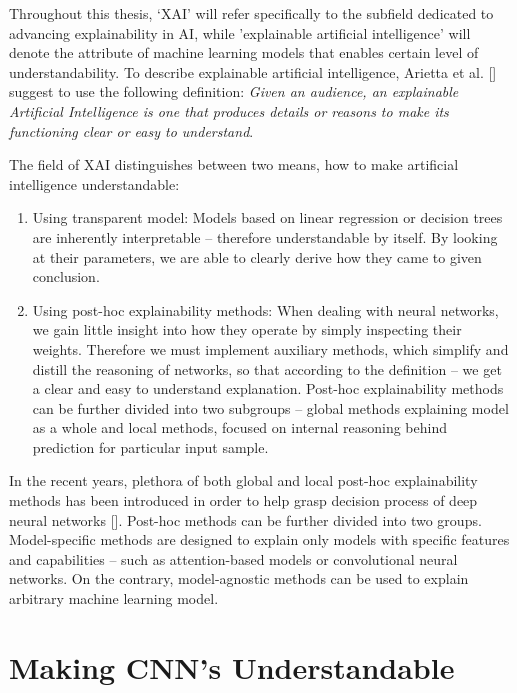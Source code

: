 
Throughout this thesis, `XAI' will refer specifically to the subfield dedicated to advancing explainability in AI, while 'explainable artificial intelligence' will denote the attribute of machine learning models that enables certain level of understandability. To describe explainable artificial intelligence, Arietta et al. [] suggest to use the following definition: \emph{Given an audience, an explainable Artificial Intelligence is one that produces details or reasons to make its functioning clear or easy to understand}.\newline

\noindent
The field of XAI distinguishes between two means, how to make artificial intelligence understandable:

\begin{enumerate}
    \item Using transparent model: Models based on linear regression or decision trees are inherently interpretable -- therefore understandable by itself. By looking at their parameters, we are able to clearly derive how they came to given conclusion.
    \item Using post-hoc explainability methods: When dealing with neural networks, we gain little insight into how they operate by simply inspecting their weights. Therefore we must implement auxiliary methods, which simplify and distill the reasoning of networks, so that according to the definition -- we get a clear and easy to understand explanation. Post-hoc explainability methods can be further divided into two subgroups -- global methods explaining model as a whole and local methods, focused on internal reasoning behind prediction for particular input sample.
\end{enumerate}

In the recent years, plethora of both global and local post-hoc explainability methods has been introduced in order to help grasp decision process of deep neural networks []. Post-hoc methods can be further divided into two groups. Model-specific methods are designed to explain only models with specific features and capabilities -- such as attention-based models or convolutional neural networks. On the contrary, model-agnostic methods can be used to explain arbitrary machine learning model.

\section{Making CNN's Understandable}

